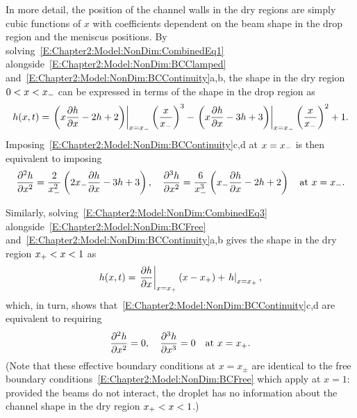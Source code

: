In more detail, the position of the channel walls in the dry regions are simply cubic functions of $x$ with coefficients dependent on the beam shape in the drop region and the meniscus positions. By solving~\eqref{E:Chapter2:Model:NonDim:CombinedEq1} alongside~\eqref{E:Chapter2:Model:NonDim:BCClamped} and~\eqref{E:Chapter2:Model:NonDim:BCContinuity}a,b, the shape in the dry region $0 < x < x_{-}$ can be expressed in terms of the shape in the drop region as
\begin{equation}\label{E:Chapter2:Numerics:SchemE:Chapter2:Reduced:ShapeLower}
h(x,t) = \left. \left( x \frac{\partial h}{\partial x} - 2 h + 2\right) \right|_{x = x_{-}} \left(\frac{x}{x_{-}}\right)^3 - \left. \left( x \frac{\partial h}{\partial x} - 3 h + 3\right) \right|_{x = x_{-}}\left(\frac{x}{x_{-}}\right)^2 + 1.
\end{equation}
Imposing~\eqref{E:Chapter2:Model:NonDim:BCContinuity}c,d at $x = x_{-}$ is then equivalent to imposing
\begin{equation}\label{E:Chapter2:Numerics:SchemE:Chapter2:Reduced:EffectiveBCLower}
\frac{\partial ^2 h}{\partial x^2} = \frac{2}{x_{-}^2}\left(2x_{-} \frac{\partial h}{\partial x} - 3h + 3\right), \quad \frac{\partial ^3 h}{\partial x^2} = \frac{6}{x_{-}^3}\left(x_{-} \frac{\partial h}{\partial x} - 2h + 2\right) \quad \text{at}~x = x_{-}.
\end{equation}

Similarly, solving~\eqref{E:Chapter2:Model:NonDim:CombinedEq3} alongside~\eqref{E:Chapter2:Model:NonDim:BCFree} and~\eqref{E:Chapter2:Model:NonDim:BCContinuity}a,b gives the shape in the dry region $x_{+} < x < 1$ as
\begin{equation}\label{E:Chapter2:Numerics:SchemE:Chapter2:Reduced:ShapeUpper}
h(x,t) = \left.\frac{\partial h}{\partial x}\right|_{x = x_{+}} (x - x_{+})+ \left.h\right|_{x = x_{+}},
\end{equation}
which, in turn, shows that~\eqref{E:Chapter2:Model:NonDim:BCContinuity}c,d are equivalent to requiring
\begin{equation}\label{E:Chapter2:Numerics:SchemE:Chapter2:Reduced:EffectiveBCUpper}
\frac{\partial ^2 h}{\partial x^2} = 0, \quad \frac{\partial ^3 h}{\partial x^3} = 0 \quad \text{at}~x = x_{+}.
\end{equation}
(Note that these effective boundary conditions at $x = x_{\pm}$ are identical to the free boundary conditions~\eqref{E:Chapter2:Model:NonDim:BCFree} which apply at $x = 1$: provided the beams do not interact, the droplet has no information about the channel shape in the dry region $x_{+} < x < 1$.)


